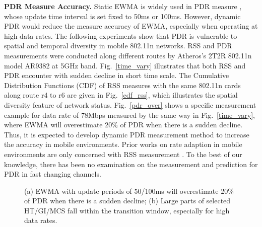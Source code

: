 \documentclass[journal,onecolumn,12pt]{IEEEtran}
\begin{document}
\textbf{PDR Measure Accuracy.} Static EWMA is widely used in PDR measure \cite{ath9k} \cite{minstrel} \cite{wong2008wireless}, whose update time interval is set fixed to 50ms or 100ms. However, dynamic PDR would reduce the measure accuracy of EWMA, especially when operating at high data rates. The following experiments show that PDR is vulnerable to spatial and temporal diversity in mobile 802.11n networks. RSS and PDR measurements were conducted along different routes by Atheros's 2T2R 802.11n model AR9382 at 5GHz band. Fig.~\ref{time_vary} illustrates that both RSS and PDR encounter with sudden decline in short time scale. The Cumulative Distribution Functions (CDF) of RSS measures with the same 802.11n cards along route r4 to r6 are given in Fig.~\ref{cdf_rss}, which illustrates the spatial diversity feature of network status. Fig.~\ref{pdr_over} shows a specific measurement example for data rate of 78Mbps measured by the same way in Fig.~\ref{time_vary}, where EWMA will overestimate 20\% of PDR when there is a sudden decline. Thus, it is expected to develop dynamic PDR measurement method to increase the accuracy in mobile environments. Prior works on rate adaption in mobile environments are only concerned with RSS measurement \cite{chen2011ram} \cite{judd2008efficient}. To the best of our knowledge, there has been no examination on the measurement and prediction for PDR in fast changing channels.
\begin{figure}[!t]
\centerline{
}
\caption{(a) EWMA with update periods of 50/100ms will overestimate 20\% of PDR when there is a sudden decline; (b) Large parts of selected HT/GI/MCS fall within the transition window, especially for high data rates.}
\label{pdr-rss}
\end{figure}
\end{document}
